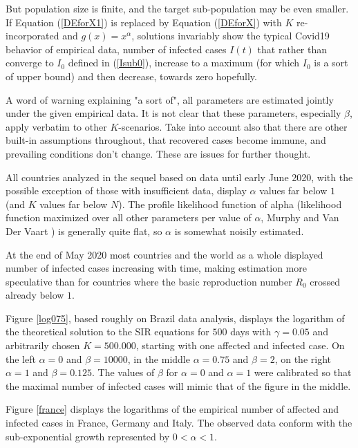 \documentclass{article}
\begin{document}
\bigskip

But population size is finite, and the target sub-population may be even smaller. If Equation (\ref{DEforX1}) is replaced by Equation (\ref{DEforX}) with $K$ re-incorporated and $g(x)=x^\alpha$, solutions invariably show the typical Covid19 behavior of empirical data, number of infected cases $I(t)$ that rather than converge to $I_0$ defined in (\ref{Isub0}), increase to a maximum (for which $I_0$ is a sort of upper bound) and then decrease, towards zero hopefully.

A word of warning explaining "a sort of", all parameters are estimated jointly under the given empirical data. It is not clear that these parameters, especially $\beta$, apply verbatim to other \linebreak $K$-scenarios. Take into account also that there are other built-in assumptions throughout, that recovered cases become immune, and prevailing conditions don't change. These are issues for further thought.

All countries analyzed in the sequel based on data until early June 2020, with the possible exception of those with insufficient data, display $\alpha$ values far below $1$ (and $K$ values far below $N$). The profile likelihood function of alpha (likelihood function maximized over all other parameters per value of $\alpha$, Murphy and Van Der Vaart \cite{Murphy}) is generally quite flat, so $\alpha$ is somewhat noisily estimated.

At the end of May 2020 most countries and the world as a whole displayed number of infected cases increasing with time, making estimation more speculative than for countries where the basic reproduction number $R_0$ crossed already below $1$.

\bigskip

Figure \ref{log075}, based roughly on Brazil data analysis, displays the logarithm of the theoretical solution to the SIR equations for $500$ days with $\gamma=0.05$ and arbitrarily chosen $K=500.000$, starting with one affected and infected case. On the left $\alpha=0$ and $\beta=10000$, in the middle $\alpha=0.75$ and $\beta=2$, on the right $\alpha=1$ and $\beta=0.125$. The values of $\beta$ for $\alpha=0$ and $\alpha=1$ were calibrated so that the maximal number of infected cases will mimic that of the figure in the middle.

Figure \ref{france} displays the logarithms of the empirical number of affected and infected cases in France, Germany and Italy. The observed data conform with the sub-exponential growth represented by $0<\alpha<1$.
\end{document}
